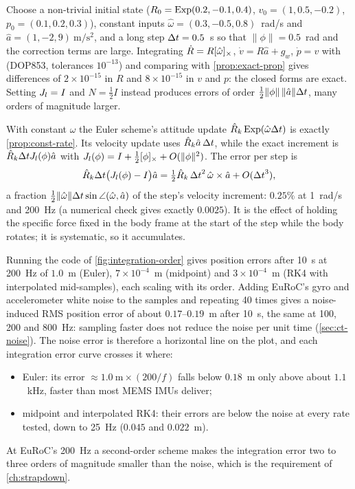 \begin{solutions}
  \item Choose a non-trivial initial state ($R_0 = \operatorname{Exp}(0.2, -0.1, 0.4)$, $v_0 = (1, 0.5, -0.2)$, $p_0 = (0.1, 0.2, 0.3)$), constant inputs
        $\hat\omega = (0.3, -0.5, 0.8)$~rad/s and $\hat a = (1, -2, 9)~\mathrm{m/s^2}$, and a long step ${\Delta t} = 0.5$~s so that $\|\phi\| = 0.5$~rad and the correction terms
        are large. Integrating $\dot R = R[\hat\omega]_{\times}$, $\dot v = R\hat a + g_w$, $\dot p = v$ with  (DOP853, tolerances $10^{-13}$) and
        comparing with \cref{prop:exact-prop} gives differences of $2\times10^{-15}$ in $R$ and $8\times10^{-15}$ in $v$ and $p$: the closed forms are exact. Setting
        $J_l = I$ and $N = \tfrac12I$ instead produces errors of order $\tfrac12\|\phi\|\,\|\hat a\|{\Delta t}$, many orders of magnitude larger.

  \item With constant $\hat\omega$ the Euler scheme's attitude update $\hat R_k\operatorname{Exp}(\hat\omega{\Delta t})$ is exactly \cref{prop:const-rate}. Its velocity update uses
        $\hat R_k\hat a\,{\Delta t}$, while the exact increment is $\hat R_k{\Delta t}J_l(\phi)\hat a$ with $J_l(\phi) = I + \tfrac12[\phi]_{\times} + O(\|\phi\|^2)$. The error per step is
        \[
          \hat R_k{\Delta t}\big(J_l(\phi) - I\big)\hat a = \tfrac12\hat R_k\,{\Delta t}^2\,\hat\omega\times\hat a + O({\Delta t}^3),
        \]
        a fraction $\tfrac12\|\hat\omega\|{\Delta t}\sin\angle(\hat\omega, \hat a)$ of the step's velocity increment: $0.25\%$ at 1~rad/s and 200~Hz (a numerical check gives
        exactly $0.0025$). It is the effect of holding the specific force fixed in the body frame at the start of the step while the body rotates;
        it is systematic, so it accumulates.

  \item Running the code of \cref{fig:integration-order} gives position errors after 10~s at 200~Hz of $1.0$~m (Euler), $7\times10^{-4}$~m (midpoint) and
        $3\times10^{-4}$~m (RK4 with interpolated mid-samples), each scaling with its order. Adding EuRoC's gyro and accelerometer white noise to the
        samples and repeating 40 times gives a noise-induced RMS position error of about $0.17$--$0.19$~m after 10~s, the same at 100, 200 and 800~Hz:
        sampling faster does not reduce the noise per unit time (\cref{sec:ct-noise}). The noise error is therefore a horizontal line on the plot, and
        each integration error curve crosses it where:
        \begin{itemize}[leftmargin=1.2em]
          \item Euler: its error $\approx 1.0~\mathrm m\times(200/f)$ falls below $0.18$~m only above about $1.1$~kHz, faster than most MEMS IMUs deliver;
          \item midpoint and interpolated RK4: their errors are below the noise at every rate tested, down to 25~Hz ($0.045$ and $0.022$~m).
        \end{itemize}
        At EuRoC's 200~Hz a second-order scheme makes the integration error two to three orders of magnitude smaller than the noise, which is the
        requirement of \cref{ch:strapdown}.


\end{solutions}
